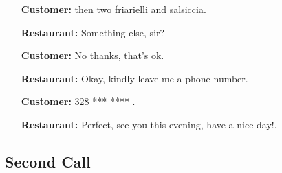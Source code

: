 \begin{itemize}
\item[\textbf{Customer:}]   then two friarielli and salsiccia.

\item[\textbf{Restaurant:}] Something else, sir?

\item[\textbf{Customer:}]   No thanks, that's ok.

\item[\textbf{Restaurant:}] Okay, kindly leave me a phone number.

\item[\textbf{Customer:}]   328 *** **** .

\item[\textbf{Restaurant:}] Perfect, see you this evening, have a nice day!.

\end{itemize}

\newpage

\subsection*{Second Call}

